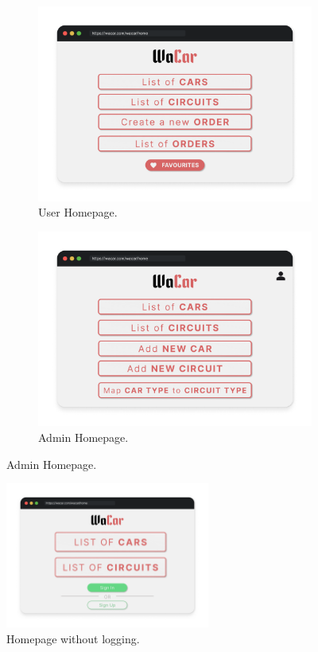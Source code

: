 \begin{figure} [H]
	\centering
	\begin{subfigure}{.5\textwidth}
	    \centering
	    \includegraphics[width=1\textwidth]{mockup/UserHome.png}
	    \caption{User Homepage.}
		\label{fig:usehome}
	\end{subfigure}%
	\begin{subfigure}{.5\textwidth}
	    \centering
		\includegraphics[width=1\textwidth]{mockup/AdminHome.png}
		\caption{Admin Homepage.}
		\label{fig:adminhome}
	\end{subfigure}
	\label{fig:home}
\end{figure}

\begin{figure}[H]
    \centering
    \includegraphics[width=0.6\textwidth]{mockup/NoLogHome.png}
    \caption{Homepage without logging.}
    \label{fig:nologhome}
\end{figure}



